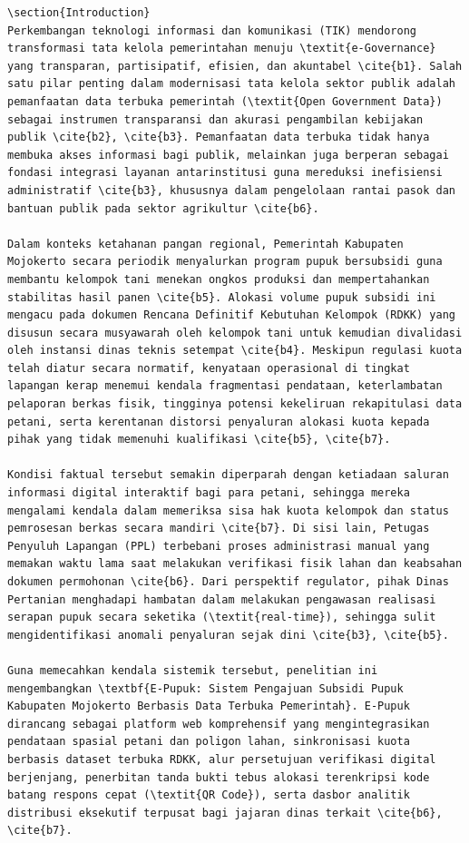 \documentclass[conference]{IEEEtran}
\begin{document}
\begin{lstlisting}
\section{Introduction}  
Perkembangan teknologi informasi dan komunikasi (TIK) mendorong transformasi tata kelola pemerintahan menuju \textit{e-Governance} yang transparan, partisipatif, efisien, dan akuntabel \cite{b1}. Salah satu pilar penting dalam modernisasi tata kelola sektor publik adalah pemanfaatan data terbuka pemerintah (\textit{Open Government Data}) sebagai instrumen transparansi dan akurasi pengambilan kebijakan publik \cite{b2}, \cite{b3}. Pemanfaatan data terbuka tidak hanya membuka akses informasi bagi publik, melainkan juga berperan sebagai fondasi integrasi layanan antarinstitusi guna mereduksi inefisiensi administratif \cite{b3}, khususnya dalam pengelolaan rantai pasok dan bantuan publik pada sektor agrikultur \cite{b6}.

Dalam konteks ketahanan pangan regional, Pemerintah Kabupaten Mojokerto secara periodik menyalurkan program pupuk bersubsidi guna membantu kelompok tani menekan ongkos produksi dan mempertahankan stabilitas hasil panen \cite{b5}. Alokasi volume pupuk subsidi ini mengacu pada dokumen Rencana Definitif Kebutuhan Kelompok (RDKK) yang disusun secara musyawarah oleh kelompok tani untuk kemudian divalidasi oleh instansi dinas teknis setempat \cite{b4}. Meskipun regulasi kuota telah diatur secara normatif, kenyataan operasional di tingkat lapangan kerap menemui kendala fragmentasi pendataan, keterlambatan pelaporan berkas fisik, tingginya potensi kekeliruan rekapitulasi data petani, serta kerentanan distorsi penyaluran alokasi kuota kepada pihak yang tidak memenuhi kualifikasi \cite{b5}, \cite{b7}.

Kondisi faktual tersebut semakin diperparah dengan ketiadaan saluran informasi digital interaktif bagi para petani, sehingga mereka mengalami kendala dalam memeriksa sisa hak kuota kelompok dan status pemrosesan berkas secara mandiri \cite{b7}. Di sisi lain, Petugas Penyuluh Lapangan (PPL) terbebani proses administrasi manual yang memakan waktu lama saat melakukan verifikasi fisik lahan dan keabsahan dokumen permohonan \cite{b6}. Dari perspektif regulator, pihak Dinas Pertanian menghadapi hambatan dalam melakukan pengawasan realisasi serapan pupuk secara seketika (\textit{real-time}), sehingga sulit mengidentifikasi anomali penyaluran sejak dini \cite{b3}, \cite{b5}.

Guna memecahkan kendala sistemik tersebut, penelitian ini mengembangkan \textbf{E-Pupuk: Sistem Pengajuan Subsidi Pupuk Kabupaten Mojokerto Berbasis Data Terbuka Pemerintah}. E-Pupuk dirancang sebagai platform web komprehensif yang mengintegrasikan pendataan spasial petani dan poligon lahan, sinkronisasi kuota berbasis dataset terbuka RDKK, alur persetujuan verifikasi digital berjenjang, penerbitan tanda bukti tebus alokasi terenkripsi kode batang respons cepat (\textit{QR Code}), serta dasbor analitik distribusi eksekutif terpusat bagi jajaran dinas terkait \cite{b6}, \cite{b7}.


\end{lstlisting}
\end{document}
